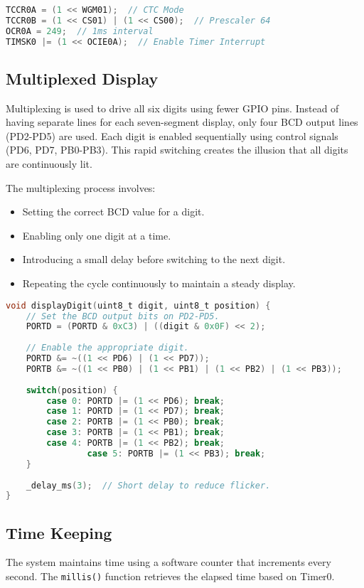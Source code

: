 \documentclass{article}
\begin{document}
\begin{lstlisting}[language=C, caption=Timer0 Configuration]
TCCR0A = (1 << WGM01);  // CTC Mode
TCCR0B = (1 << CS01) | (1 << CS00);  // Prescaler 64
OCR0A = 249;  // 1ms interval
TIMSK0 |= (1 << OCIE0A);  // Enable Timer Interrupt
\end{lstlisting}

\subsection{Multiplexed Display}
Multiplexing is used to drive all six digits using fewer GPIO pins. Instead of having separate lines for each seven-segment display, only four BCD output lines (PD2-PD5) are used. Each digit is enabled sequentially using control signals (PD6, PD7, PB0-PB3). This rapid switching creates the illusion that all digits are continuously lit.

The multiplexing process involves:
\begin{itemize}
\item Setting the correct BCD value for a digit.
\item Enabling only one digit at a time.
\item Introducing a small delay before switching to the next digit.
\item Repeating the cycle continuously to maintain a steady display.
\end{itemize}

\begin{lstlisting}[language=C, caption=Digit Multiplexing]
void displayDigit(uint8_t digit, uint8_t position) {
    // Set the BCD output bits on PD2-PD5.
    PORTD = (PORTD & 0xC3) | ((digit & 0x0F) << 2);
    
    // Enable the appropriate digit.
    PORTD &= ~((1 << PD6) | (1 << PD7));
    PORTB &= ~((1 << PB0) | (1 << PB1) | (1 << PB2) | (1 << PB3));
    
    switch(position) {
        case 0: PORTD |= (1 << PD6); break;
        case 1: PORTD |= (1 << PD7); break;
        case 2: PORTB |= (1 << PB0); break;
        case 3: PORTB |= (1 << PB1); break;
        case 4: PORTB |= (1 << PB2); break;
                case 5: PORTB |= (1 << PB3); break;
    }
    
    _delay_ms(3);  // Short delay to reduce flicker.
}
\end{lstlisting}

\subsection{Time Keeping}
The system maintains time using a software counter that increments every second. The \texttt{millis()} function retrieves the elapsed time based on Timer0.
\end{document}
